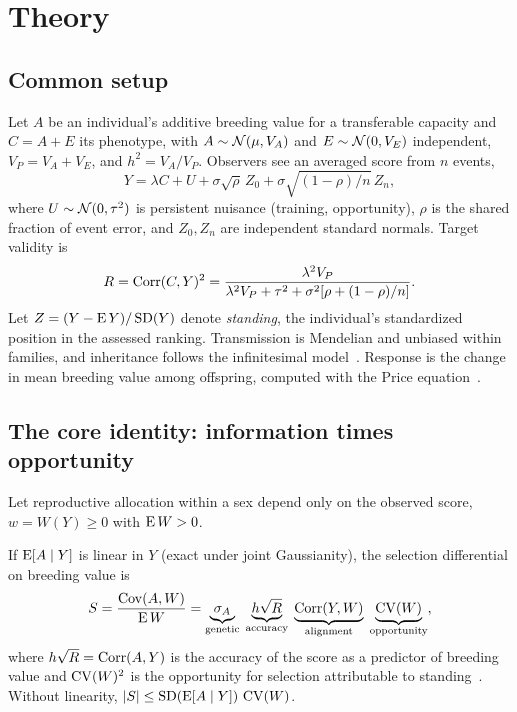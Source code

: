 \section{Theory}\label{sec:theory}

\subsection{Common setup}

\noindent Let $A$ be an individual's additive breeding value for a transferable capacity and $C=A+E$ its phenotype, with
$A\sim\mathcal{N}(\mu,V_A)$ and $E\sim\mathcal{N}(0,V_E)$ independent, $V_P=V_A+V_E$, and $h^2=V_A/V_P$. Observers see an averaged score from
$n$ events,
\begin{equation}
Y=\lambda C+U+\sigma\sqrt{\rho}\,Z_0+\sigma\sqrt{(1-\rho)/n}\,Z_n,\label{eq:score}
\end{equation}
where $U\sim\mathcal{N}(0,\tau^2)$ is persistent nuisance (training, opportunity), $\rho$ is the shared fraction of event error, and
$Z_0,Z_n$ are independent standard normals. Target validity is
\begin{equation}
R=\operatorname{Corr}(C,Y)^2=\frac{\lambda^2V_P}{\lambda^2V_P+\tau^2+\sigma^2[\rho+(1-\rho)/n]}.\label{eq:validity}
\end{equation}
Let $Z=(Y-\operatorname{E} Y)/\operatorname{SD}(Y)$ denote \emph{standing}, the individual's standardized position in the assessed ranking. Transmission
is Mendelian and unbiased within families, and inheritance follows the infinitesimal model~\cite{bulmer1980}. Response is the
change in mean breeding value among offspring, computed with the Price equation~\cite{price1970}.

\subsection{The core identity: information times opportunity}

Let reproductive allocation within a sex depend only on the observed score, $w=W(Y)\ge0$ with $\operatorname{E} W>0$.

\begin{proposition}\label{prop:identity}
If\/ $\operatorname{E}[A\mid Y]$ is linear in $Y$ (exact under joint Gaussianity), the selection differential on breeding value is
\begin{equation}
S=\frac{\operatorname{Cov}(A,W)}{\operatorname{E} W}=\underbrace{\sigma_A}_{\text{genetic}}\;\underbrace{h\sqrt{R}}_{\text{accuracy}}\;
\underbrace{\operatorname{Corr}(Y,W)}_{\text{alignment}}\;\underbrace{\operatorname{CV}(W)}_{\text{opportunity}},\label{eq:identity}
\end{equation}
where $h\sqrt{R}=\operatorname{Corr}(A,Y)$ is the accuracy of the score as a predictor of breeding value and $\operatorname{CV}(W)^2$ is the opportunity
for selection attributable to standing~\cite{crow1958}. Without linearity, $|S|\le\operatorname{SD}(\operatorname{E}[A\mid Y])\,\operatorname{CV}(W)$.
\end{proposition}

